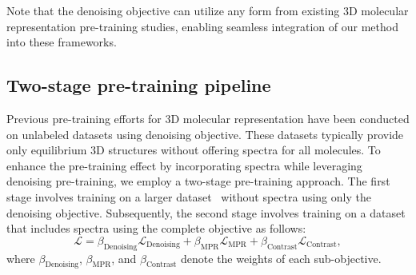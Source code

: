 Note that the denoising objective can utilize any form from existing 3D molecular representation pre-training studies, enabling seamless integration of our method into these frameworks.

\subsection{Two-stage pre-training pipeline}\label{sec:two-stage}

Previous pre-training efforts for 3D molecular representation have been conducted on unlabeled datasets using denoising objective. These datasets typically provide only equilibrium 3D structures without offering spectra for all molecules. To enhance the pre-training effect by incorporating spectra while leveraging denoising pre-training, we employ a two-stage pre-training approach. The first stage involves training on a larger dataset~\citep{PCQM} without spectra using only the denoising objective. Subsequently, the second stage involves training on a dataset that includes spectra using the complete objective as follows:
\begin{equation}
    \mathcal{L} = \beta_{\text{Denoising}} \mathcal{L}_{\text{Denoising}} + \beta_{\text{MPR}} \mathcal{L}_{\text{MPR}} + \beta_{\text{Contrast}} \mathcal{L}_{\text{Contrast}},
    \label{eq:objective}
\end{equation}
where $\beta_{\text{Denoising}}$, $\beta_{\text{MPR}}$, and $\beta_{\text{Contrast}}$ denote the weights of each sub-objective.